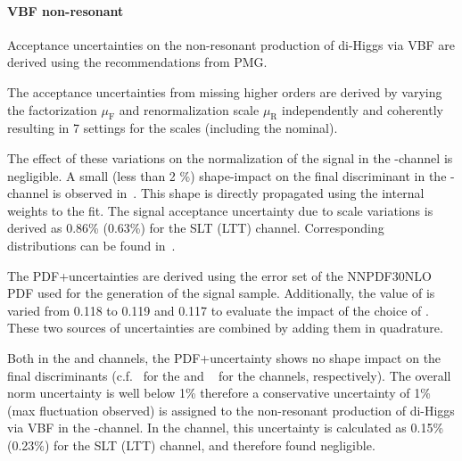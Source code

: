 \paragraph{VBF non-resonant}

Acceptance uncertainties on the non-resonant production of di-Higgs
via VBF are derived using the recommendations from PMG. 

The acceptance uncertainties from missing higher orders are derived by
varying the factorization $\mu_\text{F}$ and renormalization scale
$\mu_\text{R}$ independently and coherently resulting in 7 settings
for the scales (including the nominal). 

The effect of these variations
on the normalization of the signal in the \hadhad-channel is
negligible. A small (less than 2 \%) shape-impact on the final
discriminant in the \hadhad-channel is observed
in~. This shape is directly
propagated using the internal weights to the fit. 
The signal acceptance uncertainty due to scale variations is derived as 0.86\% (0.63\%) for the \lephad SLT (LTT) channel.
Corresponding distributions can be found in~.


The PDF+\alphas uncertainties are derived using the error set of the
NNPDF30NLO PDF used for the generation of the signal
sample. Additionally, the value of \alphas is varied from 0.118 to
0.119 and 0.117 to evaluate the impact of the choice of \alphas. These
two sources of uncertainties are combined by adding them in
quadrature. 

Both in the \hadhad and \lephad channels, the PDF+\alphas uncertainty shows
no shape impact on the final discriminants
(c.f.~ for the \hadhad and ~ for the \lephad channels, respectively). The overall norm
uncertainty is well below 1\% therefore a conservative uncertainty of
1\% (max fluctuation observed) is assigned to the non-resonant production of di-Higgs via VBF in
the \hadhad-channel. In the \lephad channel, this uncertainty is calculated as 0.15\% (0.23\%) for the SLT (LTT) channel,
and therefore found negligible.

